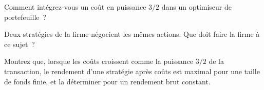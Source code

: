 \begin{interviewq}\label{iq:rs:transaction-costs-in-research:4}
Comment intégrez-vous un coût en puissance $3/2$ dans un optimiseur de portefeuille~?
\end{interviewq}

\begin{interviewq}\label{iq:rs:transaction-costs-in-research:5}
Deux stratégies de la firme négocient les mêmes actions. Que doit faire la firme à ce sujet~?
\end{interviewq}

\begin{interviewq}\label{iq:rs:transaction-costs-in-research:6}
Montrez que, lorsque les coûts croissent comme la puissance $3/2$ de la transaction, le rendement d'une stratégie après coûts est maximal pour une taille de fonds finie, et
la déterminer pour un rendement brut constant.
\end{interviewq}
